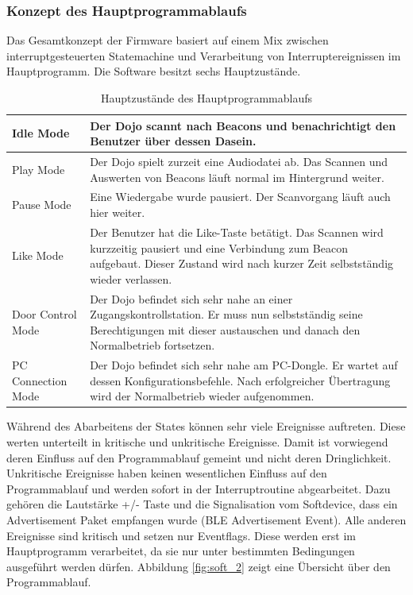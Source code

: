 \subsubsection{Konzept des Hauptprogrammablaufs}
Das Gesamtkonzept der Firmware basiert auf einem Mix zwischen interruptgesteuerten Statemachine und Verarbeitung von Interruptereignissen im Hauptprogramm. Die Software besitzt sechs Hauptzustände. 
\begin{table}[h]
  \centering
  \begin{tabular}{|p{4cm}|p{11cm}|}
    \hline
    Idle Mode & Der Dojo scannt nach Beacons und benachrichtigt den Benutzer über dessen Dasein.\\
    \hline
    Play Mode & Der Dojo spielt zurzeit eine Audiodatei ab. Das Scannen und Auswerten von Beacons läuft normal im Hintergrund weiter. \\
    \hline
    Pause Mode & Eine Wiedergabe wurde pausiert. Der Scanvorgang läuft auch hier weiter. \\
    \hline
    Like Mode & Der Benutzer hat die Like-Taste betätigt. Das Scannen wird kurzzeitig pausiert und eine Verbindung zum Beacon aufgebaut. Dieser Zustand wird nach kurzer Zeit selbstständig wieder verlassen. \\
    \hline
    Door Control Mode & Der Dojo befindet sich sehr nahe an einer Zugangskontrollstation. Er muss nun selbstständig seine Berechtigungen mit dieser austauschen und danach den Normalbetrieb fortsetzen. \\
    \hline
    PC Connection Mode & Der Dojo befindet sich sehr nahe am PC-Dongle. Er wartet auf dessen Konfigurationsbefehle. Nach erfolgreicher Übertragung wird der Normalbetrieb wieder aufgenommen.\\
    \hline
  \end{tabular}
  \caption{Hauptzustände des Hauptprogrammablaufs}\label{tab:BLE_2}
\end{table}

Während des Abarbeitens der States können sehr viele Ereignisse auftreten. Diese werten unterteilt in kritische und unkritische Ereignisse. Damit ist vorwiegend deren Einfluss auf den Programmablauf gemeint und nicht deren Dringlichkeit. 
Unkritische Ereignisse haben keinen wesentlichen Einfluss auf den Programmablauf und werden sofort in der Interruptroutine abgearbeitet. Dazu gehören die Lautstärke +/- Taste und die Signalisation vom Softdevice, dass ein Advertisement Paket empfangen wurde (BLE Advertisement Event).
Alle anderen Ereignisse sind kritisch und setzen nur Eventflags. Diese werden erst im Hauptprogramm verarbeitet, da sie nur unter bestimmten Bedingungen ausgeführt werden dürfen. Abbildung \ref{fig:soft_2} zeigt eine Übersicht über den Programmablauf. 

